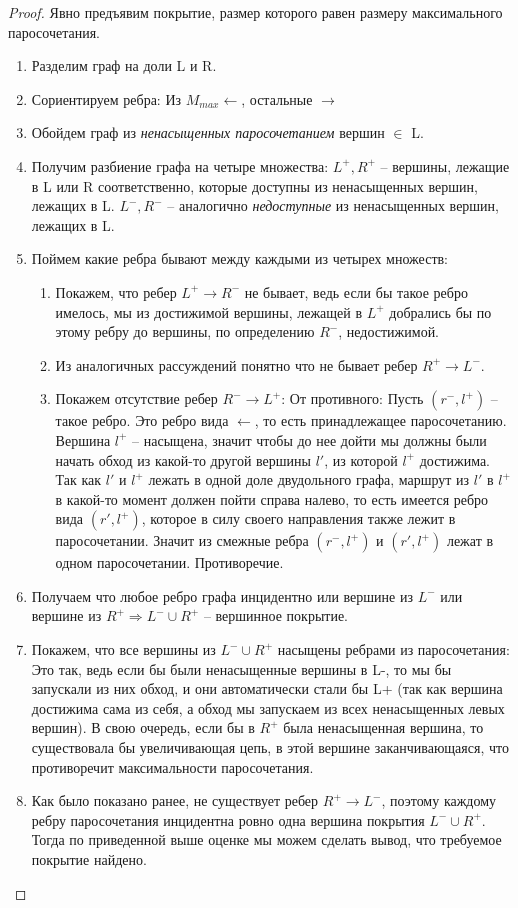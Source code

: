 \begin{proof} 
	Явно предъявим покрытие, размер которого равен размеру максимального паросочетания.
	\begin{enumerate}
		\item Разделим граф на доли L и R.
		\item Сориентируем ребра: Из $M_{max} \longleftarrow$, остальные $\longrightarrow$
		\item Обойдем граф из \textit{ненасыщенных паросочетанием} вершин $\in$ L.
		\item Получим разбиение графа на четыре множества: 
		$L^+, R^+$ -- вершины, лежащие в L или R соответственно, которые доступны из ненасыщенных вершин, лежащих в L. 
		$L^-, R ^-$ -- аналогично \textit{недоступные} из ненасыщенных вершин, лежащих в L. 
		\item Поймем какие ребра бывают между каждыми из четырех множеств:
		\begin{enumerate}
			\item Покажем, что ребер $L^+ \rightarrow R^-$ не бывает, ведь если бы такое ребро имелось, мы из достижимой вершины, лежащей в $L^+$ добрались бы по этому ребру до вершины, по определению $R^-$, недостижимой. 
			\item Из аналогичных рассуждений понятно что не бывает ребер $R^+ \rightarrow L^-$.
			\item Покажем отсутствие ребер $R^- \rightarrow L^+$:
		От противного: Пусть  $(r^-, l^+)$ -- такое ребро. Это ребро вида  $\longleftarrow$, то есть принадлежащее паросочетанию.\\
		Вершина $l^+$ -- насыщена, значит чтобы до нее дойти мы должны были начать обход из какой-то другой вершины  $l'$, из которой $l^+$ достижима.\\
		Так как  $l'$ и $l^+$ лежать в одной доле двудольного графа, маршрут из $l'$ в $l^+$ в какой-то момент должен пойти справа налево, то есть имеется ребро вида $(r', l^+)$, которое в силу своего направления также лежит в паросочетании. Значит из смежные ребра  $(r^-, l^+)$ и  $(r', l^+)$ лежат в одном паросочетании. Противоречие.\\
		\end{enumerate}
		\item Получаем что любое ребро графа инцидентно или вершине из $L^-$ или вершине из $R^+ \Rightarrow L^- \cup R^+$ -- вершинное покрытие.
		\item Покажем, что все вершины из $L^- \cup R^+$ насыщены ребрами из паросочетания:\\
		Это так, ведь если бы были ненасыщенные вершины в L-, то мы бы запускали из них обход, и они автоматически стали бы L+ (так как вершина достижима сама из себя, а обход мы запускаем из всех ненасыщенных левых вершин). В свою очередь, если бы в $R^+$ была ненасыщенная вершина, то существовала бы увеличивающая цепь, в этой вершине заканчивающаяся, что противоречит максимальности паросочетания.\\
		\item Как было показано ранее, не существует ребер $R^+ \rightarrow L^-$, поэтому каждому ребру паросочетания инцидентна ровно одна вершина покрытия $L^- \cup R^+$. Тогда по приведенной выше оценке мы можем сделать вывод, что требуемое покрытие найдено.
	\end{enumerate}
\end{proof}
